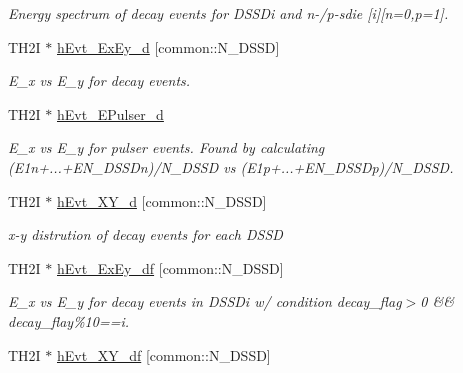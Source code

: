 \begin{DoxyCompactItemize}
\begin{DoxyCompactList}\small\item\em Energy spectrum of decay events for D\-S\-S\-Di and n-\//p-\/sdie \mbox{[}i\mbox{]}\mbox{[}n=0,p=1\mbox{]}. \end{DoxyCompactList}\item 
\hypertarget{classAnalysis_a62d15024d7d88b1ad02164cf72a4dbcb}{T\-H2\-I $\ast$ \hyperlink{classAnalysis_a62d15024d7d88b1ad02164cf72a4dbcb}{h\-Evt\-\_\-\-Ex\-Ey\-\_\-d} \mbox{[}common\-::\-N\-\_\-\-D\-S\-S\-D\mbox{]}}\label{classAnalysis_a62d15024d7d88b1ad02164cf72a4dbcb}

\begin{DoxyCompactList}\small\item\em E\-\_\-x vs E\-\_\-y for decay events. \end{DoxyCompactList}\item 
\hypertarget{classAnalysis_aa17e380dd71c6db39cceaf875f684a7b}{T\-H2\-I $\ast$ \hyperlink{classAnalysis_aa17e380dd71c6db39cceaf875f684a7b}{h\-Evt\-\_\-\-E\-Pulser\-\_\-d}}\label{classAnalysis_aa17e380dd71c6db39cceaf875f684a7b}

\begin{DoxyCompactList}\small\item\em E\-\_\-x vs E\-\_\-y for pulser events. Found by calculating (E1n+...+\-E\-N\-\_\-\-D\-S\-S\-Dn)/\-N\-\_\-\-D\-S\-S\-D vs (E1p+...+\-E\-N\-\_\-\-D\-S\-S\-Dp)/\-N\-\_\-\-D\-S\-S\-D. \end{DoxyCompactList}\item 
\hypertarget{classAnalysis_a14e6523fa4599729888c392ff593d61d}{T\-H2\-I $\ast$ \hyperlink{classAnalysis_a14e6523fa4599729888c392ff593d61d}{h\-Evt\-\_\-\-X\-Y\-\_\-d} \mbox{[}common\-::\-N\-\_\-\-D\-S\-S\-D\mbox{]}}\label{classAnalysis_a14e6523fa4599729888c392ff593d61d}

\begin{DoxyCompactList}\small\item\em x-\/y distrution of decay events for each D\-S\-S\-D \end{DoxyCompactList}\item 
\hypertarget{classAnalysis_abf794d181f27a209a2255ec810853b9d}{T\-H2\-I $\ast$ \hyperlink{classAnalysis_abf794d181f27a209a2255ec810853b9d}{h\-Evt\-\_\-\-Ex\-Ey\-\_\-df} \mbox{[}common\-::\-N\-\_\-\-D\-S\-S\-D\mbox{]}}\label{classAnalysis_abf794d181f27a209a2255ec810853b9d}

\begin{DoxyCompactList}\small\item\em E\-\_\-x vs E\-\_\-y for decay events in D\-S\-S\-Di w/ condition decay\-\_\-flag$>$0 \&\& decay\-\_\-flay\%10==i. \end{DoxyCompactList}\item 
\hypertarget{classAnalysis_ac7d6fc2923504ec24e87f675c28c2fc9}{T\-H2\-I $\ast$ \hyperlink{classAnalysis_ac7d6fc2923504ec24e87f675c28c2fc9}{h\-Evt\-\_\-\-X\-Y\-\_\-df} \mbox{[}common\-::\-N\-\_\-\-D\-S\-S\-D\mbox{]}}\label{classAnalysis_ac7d6fc2923504ec24e87f675c28c2fc9}


\end{DoxyCompactItemize}
